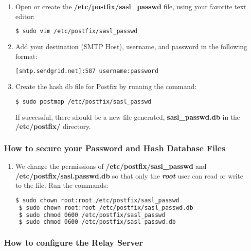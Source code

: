 \begin{enumerate}
\item { Open or create the \textbf{/etc/postfix/sasl\_passwd} file,
		using your favorite text editor: 
  \begin{lstlisting}[language=bash]
 $ sudo vim /etc/postfix/sasl_passwd
   \end{lstlisting}
 }
 \item { Add your destination (SMTP Host), username, and password in the
	 following format: 
  \begin{lstlisting}[language=bash]
 [smtp.sendgrid.net]:587 username:password 
   \end{lstlisting}
 }
 \item { Create the hash db file for Postfix by running the command:
   \begin{lstlisting}[language=bash]
 $ sudo postmap /etc/postfix/sasl_passwd 
   \end{lstlisting}
   If successful, there should be a new file generated, \textbf{sasl\_passwd.db}
		in the \textbf{/etc/postfix/} directory.
 }
\end{enumerate}

\subsubsection{How to secure your Password and Hash Database Files}

\begin{enumerate}
 \item { We change the permissions of \textbf{/etc/postfix/sasl\_passwd}
		and \textbf{/etc/postfix/sasl.passwd.db} so that only the
		\textbf\textit{root} user can read or write to the file. Run
		the commands:
  \begin{lstlisting}[language=bash]
 $ sudo chown root:root /etc/postfix/sasl_passwd 
 $ sudo chown root:root /etc/postfix/sasl_passwd.db
 $ sudo chmod 0600 /etc/postfix/sasl_passwd
 $ sudo chmod 0600 /etc/postfix/sasl_passwd.db
   \end{lstlisting}
 }
\end{enumerate}

\subsubsection{How to configure the Relay Server}

